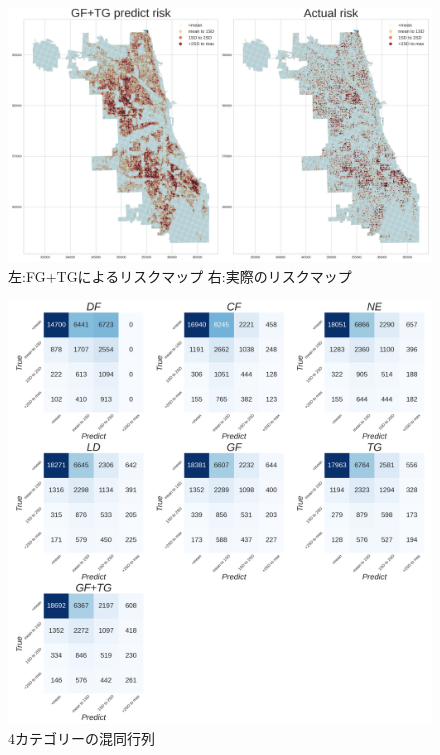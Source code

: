 \begin{figure}
  \centering %
  \includegraphics[scale=0.25]{./non-crime-timeseries-fig/GF+TG_riskmap.png}
  \caption{左:FG+TGによるリスクマップ 右:実際のリスクマップ}
  \label{fig:non-crime-timeseries-gf-tg-risk}
\end{figure}
\begin{figure}
  \centering %
  \includegraphics[scale=0.16]{./non-crime-timeseries-fig/non_crime_no_timeseries_four_cm.png}
  \caption{4カテゴリーの混同行列}
  \label{fig:non-crime-timeseries-4cm}
\end{figure}

